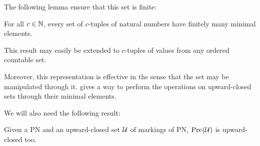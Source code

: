 The following lemma ensure that this set is finite:
\begin{lemm}
  \label{theo:dickson}
  For all $c \in \mathbb{N}$, every set of $c$-tuples of natural numbers have finitely many minimal elements.
\end{lemm}
This result may easily be extended to $c$-tuples of values from any ordered countable set.

Moreover, this representation is effective in the sense that the set may be manipulated through it.
\cite{Ganty09} gives a way to perform the operations on upward-closed sets through their minimal elements.

We will also need the following result:
\begin{lemm}
  \label{theo:pre-upc}
  Given a \ac{PN} and an upward-closed set $\mathcal{U}$ of markings of \ac{PN}, $\operatorname{Pre}_{}(\mathcal{U})$ is upward-closed too.
\end{lemm}

%
%
%
%
%
%
%
%
%
